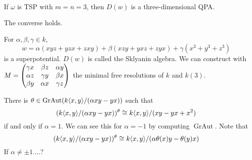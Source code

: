 \documentclass{../../../small}
\newcommand{\GrAut}{\operatorname{GrAut}}
\begin{document}
\begin{thm}\,
\begin{parts}
\item If $\omega$ is TSP with $m=n=3$, then $D(w)$ is a three-dimensional QPA.
\item The converse holds.
\end{parts}
\end{thm}


\begin{ex}
For $\alpha,\beta,\gamma\in k$,
\[w=\alpha(xyz+yzx+zxy)+\beta(xzy+yxz+zyx)+\gamma(x^3+y^3+z^3)\]
is a superpotential.
$D(w)$ is called the Sklyanin algebra.
We can construct with $M=\begin{pmatrix}\gamma x&\beta z&\alpha y\\\alpha z&\gamma y&\beta x\\\beta y&\alpha x&\gamma z\end{pmatrix}$ the minimal free resolutions of $k$ and $k(3)$.
\end{ex}


There is $\theta\in\GrAut(k\<x,y\>/(\alpha xy-yx))$ such that
\[(k\langle x,y\rangle/(\alpha xy-yx))^\theta\cong k\langle x,y\rangle/(xy-yx+x^2)\]
if and only if $\alpha=1$.
We can see this for $\alpha=-1$ by computing $\GrAut$.
Note that
\[(k\langle x,y\rangle/(\alpha xy-yx))^\theta\cong k\langle x,y\rangle/(\alpha\theta(x)y-\theta(y)x)\]
If $\alpha\ne\pm1$....?
\end{document}
